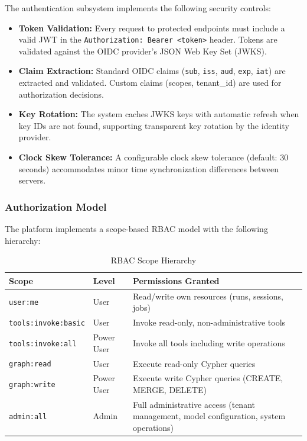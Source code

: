 \documentclass[a4paper,twoside]{sapthesis}
\begin{document}
The authentication subsystem implements the following security controls:

\begin{itemize}
    \item \textbf{Token Validation:} Every request to protected endpoints must include a valid JWT in the \texttt{Authorization: Bearer <token>} header. Tokens are validated against the OIDC provider's JSON Web Key Set (JWKS).
    
    \item \textbf{Claim Extraction:} Standard OIDC claims (\texttt{sub}, \texttt{iss}, \texttt{aud}, \texttt{exp}, \texttt{iat}) are extracted and validated. Custom claims (scopes, tenant\_id) are used for authorization decisions.
    
    \item \textbf{Key Rotation:} The system caches JWKS keys with automatic refresh when key IDs are not found, supporting transparent key rotation by the identity provider.
    
    \item \textbf{Clock Skew Tolerance:} A configurable clock skew tolerance (default: 30 seconds) accommodates minor time synchronization differences between servers.
\end{itemize}

\subsubsection{Authorization Model}

The platform implements a scope-based RBAC model with the following hierarchy:

\begin{table}[htbp]
\centering
\caption{RBAC Scope Hierarchy}
\label{tab:rbac-scopes}
\small
\begin{tabular}{|l|l|p{7cm}|}
\hline
\textbf{Scope} & \textbf{Level} & \textbf{Permissions Granted} \\
\midrule
\texttt{user:me} & User & Read/write own resources (runs, sessions, jobs) \\
\midrule
\texttt{tools:invoke:basic} & User & Invoke read-only, non-administrative tools \\
\midrule
\texttt{tools:invoke:all} & Power User & Invoke all tools including write operations \\
\midrule
\texttt{graph:read} & User & Execute read-only Cypher queries \\
\midrule
\texttt{graph:write} & Power User & Execute write Cypher queries (CREATE, MERGE, DELETE) \\
\midrule
\texttt{admin:all} & Admin & Full administrative access (tenant management, model configuration, system operations) \\
\midrule
\end{tabular}
\end{table}
\end{document}
